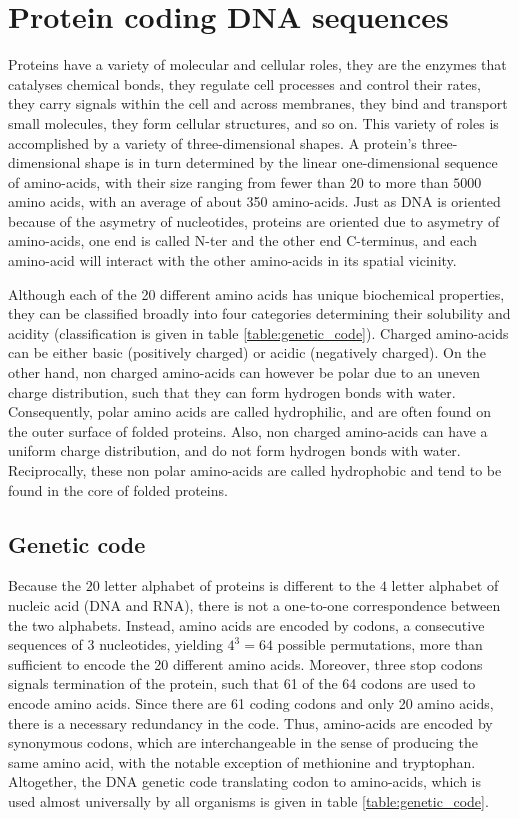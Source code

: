\section{Protein coding {DNA} sequences}
\label{sec-intro:genetic-code}
Proteins have a variety of molecular and cellular roles, they are the enzymes that catalyses chemical bonds, they regulate cell processes and control their rates, they carry signals within the cell and across membranes, they bind and transport small molecules, they form cellular structures, and so on.
This variety of roles is accomplished by a variety of three-dimensional shapes.
A protein's three-dimensional shape is in turn determined by the linear one-dimensional sequence of amino-acids, with their size ranging from fewer than $20$ to more than $5000$ amino acids, with an average of about 350 amino-acids.
Just as \acrshort{DNA} is oriented because of the asymetry of nucleotides, proteins are oriented due to asymetry of amino-acids, one end is called \gls{N-ter} and the other end C-terminus, and each amino-acid will interact with the other amino-acids in its spatial vicinity. 

Although each of the 20 different amino acids has unique biochemical properties, they can be classified broadly into four categories determining their solubility and acidity (classification is given in table \ref{table:genetic_code}).
Charged amino-acids can be either basic (positively charged) or acidic (negatively charged).
On the other hand, non charged amino-acids can however be polar due to an uneven charge distribution, such that they can form hydrogen bonds with water.
Consequently, polar amino acids are called hydrophilic, and are often found on the outer surface of folded proteins.
Also, non charged amino-acids can have a uniform charge distribution, and do not form hydrogen bonds with water.
Reciprocally, these non polar amino-acids are called hydrophobic and tend to be found in the core of folded proteins.

\subsection{Genetic code}

Because the $20$ letter alphabet of proteins is different to the $4$ letter alphabet of nucleic acid (DNA and RNA), there is not a one-to-one correspondence between the two alphabets.
Instead, amino acids are encoded by \glspl{codon}, a consecutive sequences of 3 nucleotides, yielding $4^3=64$ possible permutations, more than sufficient to encode the 20 different amino acids.
Moreover, three stop \glspl{codon} signals termination of the protein, such that 61 of the 64 \glspl{codon} are used to encode amino acids.
Since there are 61 coding \glspl{codon} and only 20 amino acids, there is a necessary redundancy in the code.
Thus, amino-acids are encoded by synonymous \glspl{codon}, which are interchangeable in the sense of producing the same amino acid, with the notable exception of methionine and tryptophan.
Altogether, the \acrshort{DNA} genetic code translating \gls{codon} to amino-acids, which is used almost universally by all organisms is given in table \ref{table:genetic_code}.

